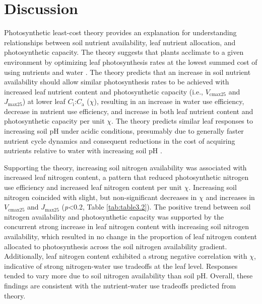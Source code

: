 \section{Discussion}
\noindent Photosynthetic least-cost theory provides an explanation for understanding relationships between soil nutrient availability, leaf nutrient allocation, and photosynthetic capacity. The theory suggests that plants acclimate to a given environment by optimizing leaf photosynthesis rates at the lowest summed cost of using nutrients and water . The theory predicts that an increase in soil nutrient availability should allow similar photosynthesis rates to be achieved with increased leaf nutrient content and photosynthetic capacity (i.e., $V_\mathrm{cmax25}$ and $J_\mathrm{max25}$) at lower leaf $C_\mathrm{i}$:$C_\mathrm{a}$ ($\chi$), resulting in an increase in water use efficiency, decrease in nutrient use efficiency, and increase in both leaf nutrient content and photosynthetic capacity per unit $\chi$. The theory predicts similar leaf responses to increasing soil pH under acidic conditions, presumably due to generally faster nutrient cycle dynamics and consequent reductions in the cost of acquiring nutrients relative to water with increasing soil pH .
    
Supporting the theory, increasing soil nitrogen availability was associated with increased leaf nitrogen content, a pattern that reduced photosynthetic nitrogen use efficiency and increased leaf nitrogen content per unit $\chi$. Increasing soil nitrogen coincided with slight, but non-significant decreases in $\chi$ and increases in $V_\mathrm{cmax25}$ and $J_\mathrm{max25}$ (\textit{p}<0.2, Table \ref{tab:table3.2}). The positive trend between soil nitrogen availability and photosynthetic capacity was supported by the concurrent strong increase in leaf nitrogen content with increasing soil nitrogen availability, which resulted in no change in the proportion of leaf nitrogen content allocated to photosynthesis across the soil nitrogen availability gradient. Additionally, leaf nitrogen content exhibited a strong negative correlation with $\chi$, indicative of strong nitrogen-water use tradeoffs at the leaf level. Responses tended to vary more due to soil nitrogen availability than soil pH. Overall, these findings are consistent with the nutrient-water use tradeoffs predicted from theory.

